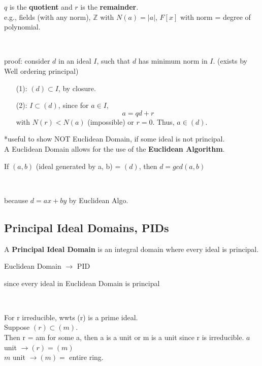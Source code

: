 \documentclass[12pt]{article}
\begin{document}
$q$ is the \textbf{quotient} and $r$ is the \textbf{remainder}.\\

e.g., fields (with any norm), $\mathbb{Z}$ with $N(a) = |a|$, $F[x]$ with norm = degree of polynomial.  \\

\centerline{}\\
\textcolor[gray]{0.5}{proof: consider $d$ in an ideal $I$, such that $d$ has minimum norm in $I$. (exists by Well ordering principal)
\begin{enumerate}
    \item[(1): ] $(d) \subset I$, by closure.
    \item[(2): ] $I \subset (d)$, since for $a \in I$, \\
    $$a = qd + r$$
    with $N(r) < N(a)$ (impossible) or $r = 0$. Thus, $a \in (d)$.
\end{enumerate}
}

*useful to show NOT Euclidean Domain, if some ideal is not principal.\\


A Euclidean Domain allows for the use of the \textbf{Euclidean Algorithm}.\\

\centerline{If $(a, b)$ (ideal generated by a, b) = $(d)$, then $d = gcd(a, b)$}\\
\centerline{\indent\textcolor[gray]{0.5}{because $d = ax + by$ by Euclidean Algo.}}

\subsection*{Principal Ideal Domains, PIDs}

A \textbf{ Principal Ideal Domain} is an integral domain where every ideal is principal.

\centerline{ Euclidean Domain $\rightarrow$ PID}
\centerline{\textcolor[gray]{0.5}{since every ideal in Euclidean Domain is principal}}
\ \\

\centerline{}
\textcolor[gray]{0.5}{\noindent For r irreducible, wwts (r) is a prime ideal.\\
Suppose $(r) \subset (m)$. \\
Then r = am for some a, then a is a unit or m is a unit since r is irreducible.
$a$ unit $\rightarrow (r) = (m)$\\
$m$ unit $\rightarrow (m) =$ entire ring.
}
\end{document}
